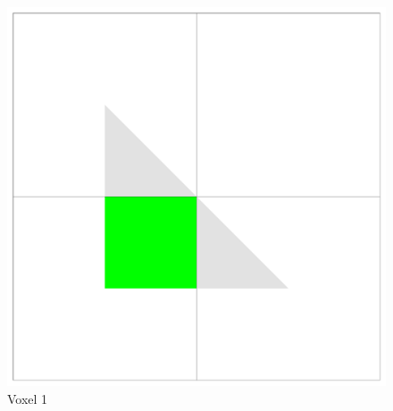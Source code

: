 \begin{figure}[!htb]
  \includegraphics[width=\linewidth]{drawings/cubes_01.pdf}
  Voxel 1 
  

\end{figure}
